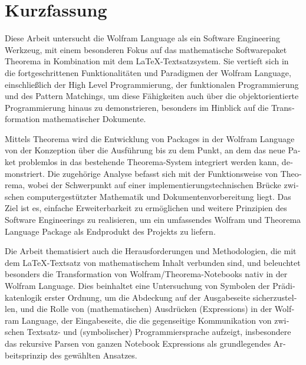 \chapter{Kurzfassung}

\begin{german}

Diese Arbeit untersucht die Wolfram Language als ein Software Engineering Werkzeug, mit einem besonderen Fokus auf das mathematische Softwarepaket Theorema in Kombination mit dem \LaTeX-Textsatzsystem. Sie vertieft sich in die fortgeschrittenen Funktionalitäten und Paradigmen der Wolfram Language, einschließlich der High Level Programmierung, der funktionalen Programmierung und des Pattern Matchings, um diese Fähigkeiten auch über die objektorientierte Programmierung hinaus zu demonstrieren, besonders im Hinblick auf die Transformation mathematischer Dokumente.

Mittels Theorema wird die Entwicklung von Packages in der Wolfram Language von der Konzeption über die Ausführung bis zu dem Punkt, an dem das neue Paket problemlos in das bestehende Theorema-System integriert werden kann, demonstriert. Die zugehörige Analyse befasst sich mit der Funktionsweise von Theorema, wobei der Schwerpunkt auf einer implementierungstechnischen Brücke zwischen computergestützter Mathematik und Dokumentenvorbereitung liegt. Das Ziel ist es, einfache Erweiterbarkeit zu ermöglichen und weitere Prinzipien des Software Engineerings zu realisieren, um ein umfassendes Wolfram und Theorema Language Package als Endprodukt des Projekts zu liefern.

Die Arbeit thematisiert auch die Herausforderungen und Methodologien, die mit dem \LaTeX-Textsatz von mathematischem Inhalt verbunden sind, und beleuchtet besonders die Transformation von Wolfram/Theorema-Notebooks nativ in der Wolfram Language. Dies beinhaltet eine Untersuchung von Symbolen der Prädikatenlogik erster Ordnung, um die Abdeckung auf der Ausgabeseite sicherzustellen, und die Rolle von (mathematischen) Ausdrücken (Expressions) in der Wolfram Language, der Eingabeseite, die die gegenseitige Kommunikation von zwischen Textsatz- und (symbolischer) Programmiersprache aufzeigt, insbesondere das rekursive Parsen von ganzen Notebook Expressions als grundlegendes Arbeitsprinzip des gewählten Ansatzes.

\end{german}
